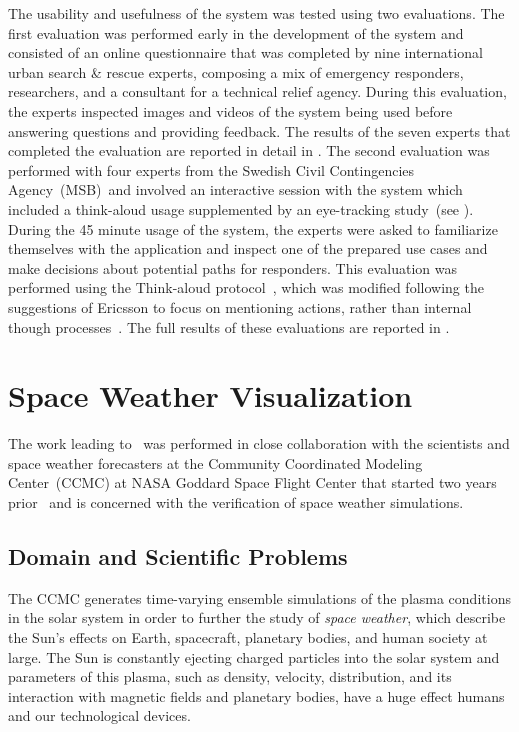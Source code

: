 The usability and usefulness of the system was tested using two evaluations.  The first evaluation was performed early in the development of the system and consisted of an online questionnaire that was completed by nine international urban search \& rescue experts, composing a mix of emergency responders, researchers, and a consultant for a technical relief agency.  During this evaluation, the experts inspected images and videos of the system being used before answering questions and providing feedback.  The results of the seven experts that completed the evaluation are reported in detail in \paperVMV.  The second evaluation was performed with four experts from the Swedish Civil Contingencies Agency~(MSB)~and involved an interactive session with the system which included a think-aloud usage supplemented by an eye-tracking study~(see ).  During the 45 minute usage of the system, the experts were asked to familiarize themselves with the application and inspect one of the prepared use cases and make decisions about potential paths for responders.  This evaluation was performed using the Think-aloud protocol~\cite{lewis1993task}, which was modified following the suggestions of Ericsson to focus on mentioning actions, rather than internal though processes~\cite{ericsson1980verbal}.  The full results of these evaluations are reported in \paperCGF.





\section{Space Weather Visualization} \label{contributions:spaceweather}
The work leading to \paperCME\ was performed in close collaboration with the scientists and space weather forecasters at the Community Coordinated Modeling Center~(CCMC) at NASA Goddard Space Flight Center that started two years prior~\cite{tornros2013interactive, bock14vcmass} and is concerned with the verification of space weather simulations.


\subsection{Domain and Scientific Problems} \label{contributions:astro:spaceweather:background}
The CCMC generates time-varying ensemble simulations of the plasma conditions in the solar system in order to further the study of \emph{space weather}, which describe the Sun's effects on Earth, spacecraft, planetary bodies, and human society at large.  The Sun is constantly ejecting charged particles into the solar system and parameters of this plasma, such as density, velocity, distribution, and its interaction with magnetic fields and planetary bodies, have a huge effect humans and our technological devices.

